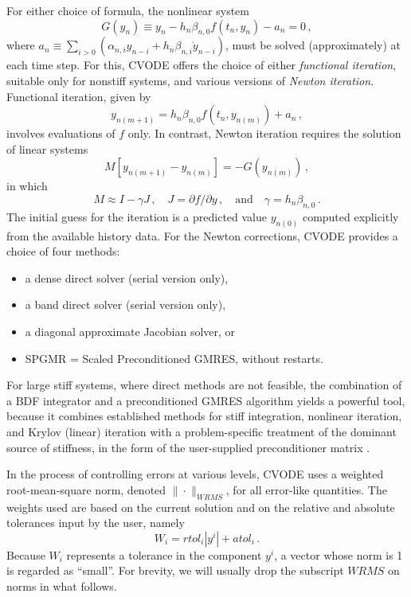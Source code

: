 For either choice of formula, the nonlinear system
\begin{equation}\label{NLS}
  G(y_n) \equiv y_n - h_n \beta_{n,0} f(t_n,y_n) - a_n = 0 \, ,
\end{equation}
where $a_n\equiv\sum_{i>0}(\alpha_{n,i}y_{n-i}+h_n\beta_{n,i}\dot{y}_{n-i})$, 
must be solved (approximately) at each time step.  For this, CVODE
offers the choice of either {\em functional iteration}, suitable only
for nonstiff systems, and various versions of {\em Newton iteration}.
Functional iteration, given by
\[ y_{n(m+1)} = h_n \beta_{n,0} f(t_n,y_{n(m)}) + a_n \, , \]
involves evaluations of $f$ only.  In contrast, Newton iteration requires
the solution of linear systems
\begin{equation}\label{Newtoncorr}
  M [y_{n(m+1)} - y_{n(m)}] = -G(y_{n(m)}) \, ,
\end{equation}
in which
\begin{equation}\label{Newtonmat} 
  M \approx I - \gamma J \, ,
  \quad J = \partial f / \partial y \, ,
  \quad \mbox{and} \quad
  \gamma = h_n \beta_{n,0} \, . 
\end{equation}
The initial guess for the iteration is a predicted value $y_{n(0)}$
computed explicitly from the available history data.
For the Newton corrections, CVODE provides a choice of four methods:
\begin{itemize}
\item a dense direct solver (serial version only),
\item a band direct solver (serial version only),
\item a diagonal approximate Jacobian solver, or
\item SPGMR = Scaled Preconditioned GMRES, without restarts.
\end{itemize}
For large stiff systems, where direct methods are not feasible, the
combination of a BDF integrator and a preconditioned GMRES algorithm
yields a powerful tool, because it combines established methods for
stiff integration, nonlinear iteration, and Krylov (linear) iteration
with a problem-specific treatment of the dominant source of stiffness,
in the form of the user-supplied preconditioner matrix \cite{BrHi:89}.

In the process of controlling errors at various levels, CVODE uses a
weighted root-mean-square norm, denoted $\|\cdot\|_{WRMS}$, for all error-like
quantities.  The weights used are based on the current solution and
on the relative and absolute tolerances input by the user, namely
\begin{equation}\label{errwt}
 W_i = rtol_i |y^i| + atol_i \, .
\end{equation}
Because $W_i$ represents a tolerance in the component $y^i$, a vector
whose norm is 1 is regarded as ``small''.  For brevity, we will
usually drop the subscript $WRMS$ on norms in what follows.

